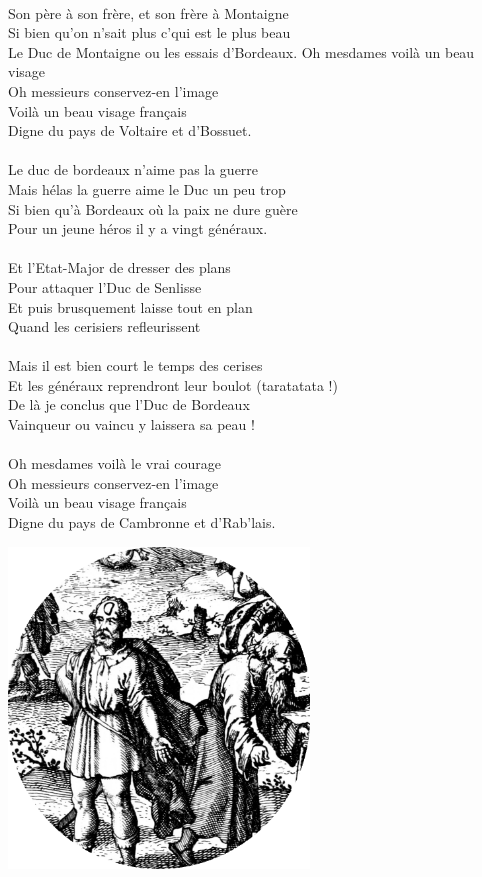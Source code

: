 \\Son père à son frère, et son frère à Montaigne
\\Si bien qu'on n'sait plus c'qui est le plus beau
\\Le Duc de Montaigne ou les essais d'Bordeaux.
\breakpage
Oh mesdames voilà un beau visage
\\Oh messieurs conservez-en l'image
\\Voilà un beau visage français
\\Digne du pays de Voltaire et d'Bossuet.
\\\\Le duc de bordeaux n'aime pas la guerre
\\Mais hélas la guerre aime le Duc un peu trop
\\Si bien qu'à Bordeaux où la paix ne dure guère
\\Pour un jeune héros il y a vingt généraux.
\\\\Et l'Etat-Major de dresser des plans
\\Pour attaquer l'Duc de Senlisse
\\Et puis brusquement laisse tout en plan
\\Quand les cerisiers refleurissent
\\\\Mais il est bien court le temps des cerises
\\Et les généraux reprendront leur boulot (taratatata !)
\\De là je conclus que l'Duc de Bordeaux
\\Vainqueur ou vaincu y laissera sa peau !
\\\\Oh mesdames voilà le vrai courage
\\Oh messieurs conservez-en l'image
\\Voilà un beau visage français
\\Digne du pays de Cambronne et d'Rab'lais.
\bigskip
\begin{center}
\includegraphics[width=0.6\textwidth]{images/brev19.png}
\end{center}

\breakpage